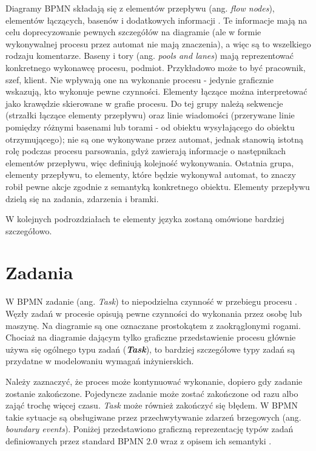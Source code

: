 \documentclass[declaration,shortabstract,mgr]{iithesis}
\newcommand{\bpmn}{BPMN }
\begin{document}
Diagramy \bpmn składają się z elementów przepływu (ang. \emph{flow nodes}), elementów łączących, basenów i dodatkowych informacji \cite{process-maker-bpmn}. Te informacje mają na celu doprecyzowanie pewnych szczegółów na diagramie (ale w formie wykonywalnej procesu przez automat nie mają znaczenia), a więc są to wszelkiego rodzaju komentarze. Baseny i tory (ang. \emph{pools and lanes}) mają reprezentować konkretnego wykonawcę procesu, podmiot. Przykładowo może to być pracownik, szef, klient. Nie wpływają one na wykonanie procesu - jedynie graficznie wskazują, kto wykonuje pewne czynności. Elementy łączące można interpretować jako krawędzie skierowane w grafie procesu. Do tej grupy należą sekwencje (strzałki łączące elementy przepływu) oraz linie wiadomości (przerywane linie pomiędzy różnymi basenami lub torami - od obiektu wysyłającego do obiektu otrzymującego); nie są one wykonywane przez automat, jednak stanowią istotną rolę podczas procesu parsowania, gdyż zawierają informacje o następnikach elementów przepływu, więc definiują kolejność wykonywania. Ostatnia grupa, elementy przepływu, to elementy, które będzie wykonywał automat, to znaczy robił pewne akcje zgodnie z semantyką konkretnego obiektu. Elementy przepływu dzielą się na zadania, zdarzenia i bramki.

W kolejnych podrozdziałach te elementy języka zostaną omówione bardziej szczegółowo.

\section{Zadania}
W \bpmn zadanie (ang. \textit{Task}) to niepodzielna czynność w przebiegu procesu \cite{bruce-silver-bpmn-tasks}. Węzły zadań w procesie opisują pewne czynności do wykonania przez osobę lub maszynę. Na diagramie są one oznaczane prostokątem z zaokrąglonymi rogami. Chociaż na diagramie dającym tylko graficzne przedstawienie procesu głównie używa się ogólnego typu zadań (\textbf{\textit{Task}}), to bardziej szczegółowe typy zadań są przydatne w modelowaniu wymagań inżynierskich. 

Należy zaznaczyć, że proces może kontynuować wykonanie, dopiero gdy zadanie zostanie zakończone. Pojedyncze zadanie może zostać zakończone od razu albo zająć trochę więcej czasu. \textit{Task} może również zakończyć się błędem. W \bpmn takie sytuacje są obsługiwane przez przechwytywanie zdarzeń brzegowych (ang. \textit{boundary events}). Poniżej przedstawiono graficzną reprezentację typów zadań definiowanych przez standard \bpmn 2.0 wraz z opisem ich semantyki \cite{visual-paradigm-tasks-explained}.
\end{document}
